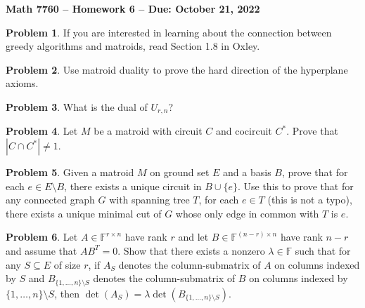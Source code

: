 \documentclass[letterpaper,11pt]{amsart}
\theoremstyle{plain}
\theoremstyle{definition}
\newtheorem{pr}{Problem}
\theoremstyle{remark}
\begin{document}
\Large

\begin{center}
{\bf Math 7760 -- Homework  6 --  Due:  October 21, 2022}
\end{center}

\normalsize


\bigskip


\bigskip

\begin{pr}
    If you are interested in learning about the connection between greedy algorithms and matroids, read Section 1.8 in Oxley.
\end{pr}

\begin{pr}
    Use matroid duality to prove the hard direction of the hyperplane axioms.
\end{pr}

\begin{pr}
    What is the dual of $U_{r,n}$?
\end{pr}

\bigskip

\bigskip

\begin{pr}
    Let $M$ be a matroid with circuit $C$ and cocircuit $C^*$.
    Prove that $|C \cap C^*| \neq 1$.
\end{pr}

\begin{pr}
    Given a matroid $M$ on ground set $E$ and a basis $B$, prove that for each $e \in E\setminus B$,
    there exists a unique circuit in $B \cup \{e\}$.
    Use this to prove that for any connected graph $G$ with spanning tree $T$,
    for each $e \in T$ (this is not a typo), there exists a unique minimal cut of $G$ whose only edge in common with $T$ is $e$.
\end{pr}

\begin{pr}
    Let $A \in \mathbb{F}^{r \times n}$ have rank $r$
    and let $B \in \mathbb{F}^{(n-r) \times n}$ have rank $n-r$ and assume that $AB^T = 0$.
    Show that there exists a nonzero $\lambda \in \mathbb{F}$ such that for any $S \subseteq E$ of size $r$,
    if $A_S$ denotes the column-submatrix of $A$ on columns indexed by $S$ and $B_{\{1,\dots,n\}\setminus S}$
    denotes the column-submatrix of $B$ on columns indexed by $\{1,\dots,n\}\setminus S$,
    then $\det(A_S) = \lambda \det(B_{\{1,\dots,n\}\setminus S})$.
\end{pr}
\end{document}
